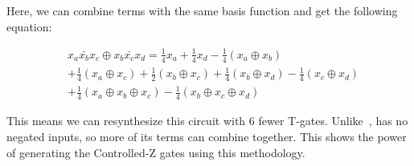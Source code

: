 \begin{example}
  Here, we can combine terms with the same basis function and get the following equation:
  
  \begin{equation}
    \label{eq-series-simp}
    \begin{aligned}
      & x_a \bar{x_b} x_c \oplus x_b \bar{x_c} x_d = \frac{1}{4}x_a + \frac{1}{4}x_d
      - \frac{1}{4}(x_a \oplus x_b) \\
      & + \frac{1}{4}(x_a \oplus x_c) + \frac{1}{2}(x_b \oplus x_c)
      + \frac{1}{4}(x_b \oplus x_d) -\frac{1}{4}(x_c \oplus x_d)     \\
      & + \frac{1}{4}(x_a \oplus x_b \oplus x_c) - \frac{1}{4}(x_b \oplus x_c \oplus x_d) 
    \end{aligned}
  \end{equation}

  This means we can resynthesize this circuit with 6 fewer T-gates. Unlike~,
   has no negated inputs, so more of its terms can combine together. This shows
  the power of generating the Controlled-Z gates using this methodology.
  
\end{example}




